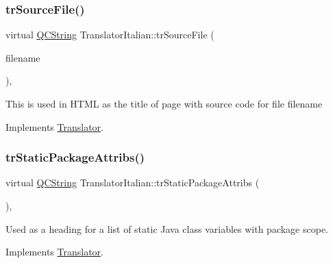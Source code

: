 \mbox{\label{class_translator_italian_aff84143ff9de089e1bda981fb2006c28}} 
\subsubsection{\texorpdfstring{trSourceFile()}{trSourceFile()}}
{\footnotesize\ttfamily virtual \mbox{\hyperlink{class_q_c_string}{Q\+C\+String}} Translator\+Italian\+::tr\+Source\+File (\begin{DoxyParamCaption}\item[{\mbox{\hyperlink{class_q_c_string}{Q\+C\+String}} \&}]{filename }\end{DoxyParamCaption})\hspace{0.3cm}{\ttfamily [inline]}, {\ttfamily [virtual]}}

This is used in H\+T\+ML as the title of page with source code for file filename 

Implements \mbox{\hyperlink{class_translator}{Translator}}.

\mbox{\label{class_translator_italian_a0cbd073783f6e8c1e335e4b9b73e77e5}} 
\subsubsection{\texorpdfstring{trStaticPackageAttribs()}{trStaticPackageAttribs()}}
{\footnotesize\ttfamily virtual \mbox{\hyperlink{class_q_c_string}{Q\+C\+String}} Translator\+Italian\+::tr\+Static\+Package\+Attribs (\begin{DoxyParamCaption}{ }\end{DoxyParamCaption})\hspace{0.3cm}{\ttfamily [inline]}, {\ttfamily [virtual]}}

Used as a heading for a list of static Java class variables with package scope. 

Implements \mbox{\hyperlink{class_translator}{Translator}}.

\mbox{\label{class_translator_italian_a858344d24e5de4a7681e508e8b877384}} 
